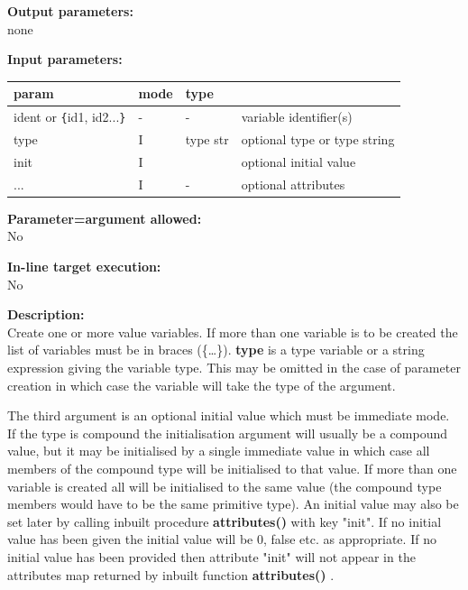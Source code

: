         {\bf Output parameters:} \\
        none
        
        {\bf Input parameters:} \\
        \begin{tabular}{| l | l | l | l |}
        \hline
        param  & mode & type & \\
        \hline \hline
        ident or \verb'{'id1, id2...\verb'}' & - &  - & variable identifier(s) \\ \hline
        type                   & I & type str & optional type or type string   \\ \hline
        init                   & I &          & optional initial value         \\ \hline
        ...                    & I &  -       & optional attributes            \\ \hline
        \end{tabular}
        
        {\bf Parameter=argument allowed:} \\
        No
        
        {\bf In-line target execution:} \\
        No
        
        {\bf Description:} \\
        Create one or more value variables. If more than one variable is to
        be created the list of variables must be in braces (\{\dots\}).
        {\bf type} is a type variable or a string expression giving the
        variable type. This may be omitted in the case of parameter
        creation in which case the variable will take the type of the
        argument.
        
        The third argument is an optional initial value which must be immediate
        mode. If the type is compound the initialisation argument will usually
        be a compound value, but it may be initialised by a single immediate
        value in which case all members of the compound type will be initialised
        to that value. If more than one variable is created all will be
        initialised to the same value (the compound type members would have to
        be the same primitive type). An initial value may also be set later by
        calling inbuilt procedure {\bf attributes()}
         with key "init". If no initial value has
        been given the initial value will be 0, false etc. as appropriate. If no
        initial value has been provided then attribute "init" will not appear in
        the attributes map returned by inbuilt function {\bf attributes()}
        .
        
